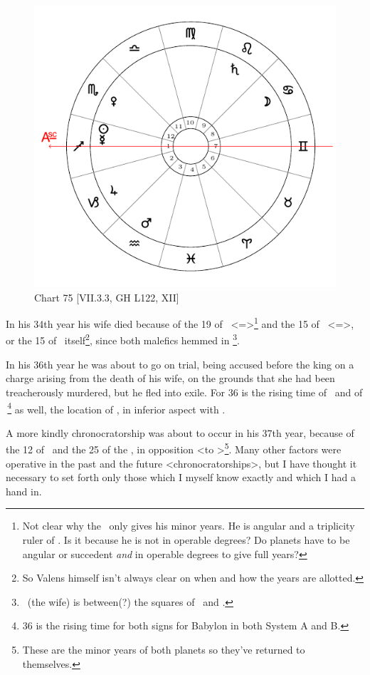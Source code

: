 \begin{figure}
\centering
\vspace{-20pt}
\includegraphics[width=.68\textwidth]{charts/7_3_3}
\caption{Chart 75 [VII.3.3, GH L122, XII]}
\label{fig:chart75}
\end{figure}


In his 34th year his wife died because of the 19 of \Leo\, <=\Sun>\footnote{Not clear why the \Sun\, only gives his minor years. He is angular and a triplicity ruler of \Sagittarius. Is it because he is not in operable degrees? Do planets have to be angular or succedent \textsl{and} in operable degrees to give full years?} and the 15 of \Scorpio\, <=\Mars>, or the 15 of \Mars\, itself\footnote{So Valens himself isn't always clear on when and how the years are allotted.}, since both malefics hemmed in \Venus\footnote{\Venus\, (the wife) is between(?) the squares of \Mars\, and \Saturn.}. 

In his 36th year he was about to go on trial, being accused before the king on a charge arising from the death of his wife, on the grounds that she had been treacherously murdered, but he fled into exile. For
36 is the rising time of \Leo\, and of \Scorpio\,\footnote{36 is the rising time for both signs for Babylon in  both System A and B.} as well, the location of \Venus, in inferior aspect with \Saturn. 

A more kindly chronocratorship was about to occur in his 37th year, because of the 12 of \Jupiter\, and the 25 of the \Moon, in opposition <to \Jupiter>\footnote{These are the minor years of both planets so they've returned to themselves.}. Many other factors were operative in the past and the future <chronocratorships>, but I have thought it necessary to set forth only those which I myself know exactly
and which I had a hand in.

